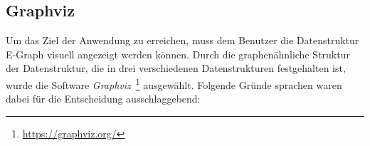 
\subsection{Graphviz}

Um das Ziel der Anwendung zu erreichen, muss dem Benutzer die Datenstruktur E-Graph visuell angezeigt werden können. 
Durch die graphenähnliche Struktur der Datenstruktur, die in drei verschiedenen Datenstrukturen festgehalten ist, wurde die Software 
\textit{Graphviz}~\footnote{\hspace{1.5mm}\url{https://graphviz.org/}} ausgewählt. Folgende Gründe sprachen waren dabei für die Entscheidung ausschlaggebend:


